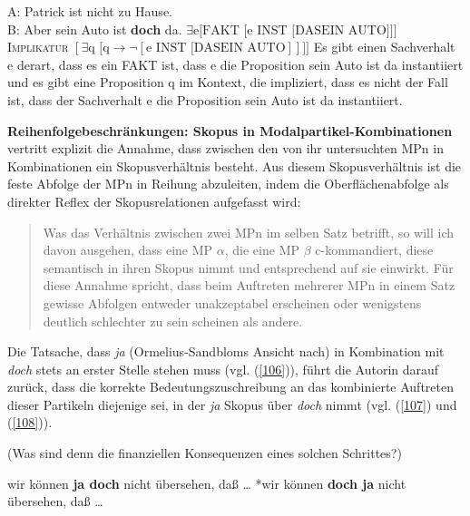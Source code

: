 \begin{exe}
	\ex\label{105} 
		\begin{xlist}	
			\ex\label{105a} A: Patrick ist nicht zu Hause.\\
			 				B: Aber sein Auto ist \textbf{doch} da.                                   
			\hfill\hbox {\citet[83]{Ormelius-Sandblom1997}}
			\ex\label{105b} $\exists \textrm{e[FAKT [e INST [DASEIN AUTO}]]]$ \\
							\textsc{Implikatur} $[\exists \textrm{q [q} \rightarrow \neg [\textrm{e INST [DASEIN AUTO}]]]]$			
			\ex\label{105c} \glq Es gibt einen Sachverhalt e derart, dass es ein FAKT ist, dass e die Proposition \glq sein Auto ist da\grq {} instantiiert 							und es gibt eine Proposition q im Kontext, die impliziert, dass es nicht der Fall ist, dass der Sachverhalt e die Proposition 								\glq sein Auto ist da\grq {} instantiiert.\grq {}
		\end{xlist}
\end{exe}
\textbf{Reihenfolgebeschränkungen: Skopus in Modalpartikel-Kombinationen}\\
\citet[92-93]{Ormelius-Sandblom1997} vertritt explizit die Annahme, dass zwischen den von ihr untersuchten MPn in Kombinationen ein Skopusverhältnis  besteht. Aus diesem Skopusverhältnis ist die feste Abfolge der MPn in Reihung abzuleiten, indem die Oberflächenabfolge als direkter Reflex der Skopusrelationen aufgefasst wird: 

\begin{quotation}
Was das Verhältnis zwischen zwei MPn im selben Satz betrifft, so will ich davon ausgehen, dass eine MP $\alpha$, die eine MP $\beta$  c-kommandiert, diese semantisch in ihren Skopus nimmt und entsprechend auf sie einwirkt. Für diese Annahme spricht, dass beim Auftreten mehrerer MPn in einem Satz gewisse Abfolgen entweder unakzeptabel erscheinen oder wenigstens deutlich schlechter zu sein scheinen als andere.
\end{quotation}
Die Tatsache, dass \textit{ja} (Ormelius-Sandbloms Ansicht nach) in Kombination mit \textit{doch} stets an erster Stelle stehen muss (vgl. (\ref{106})), führt die Autorin darauf zurück, dass die korrekte Bedeutungszuschreibung an das kombinierte Auftreten dieser Partikeln diejenige sei, in der \textit{ja} Skopus über \textit{doch} nimmt (vgl. (\ref{107}) und (\ref{108})).

\begin{exe}
	\ex\label{106}
	(Was sind denn die finanziellen Konsequenzen eines solchen Schrittes?) 
		\begin{xlist}	
			\ex\label{106a} wir können \textbf{ja doch} nicht übersehen, daß \ldots                                  
			\ex\label{106b} *wir können \textbf{doch ja} nicht übersehen, daß \ldots
		\end{xlist}
\end{exe}

